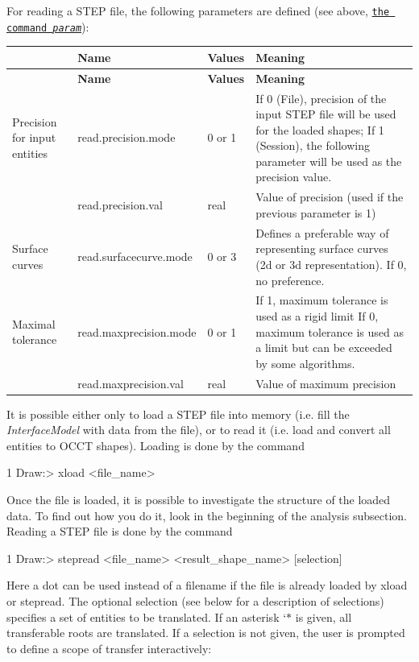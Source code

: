 For reading a S\+T\+EP file, the following parameters are defined (see above, \href{#occt_step_6_2}{\tt the command {\itshape param}})\+:

\tabulinesep=1mm
\begin{longtabu} spread 0pt [c]{*4{|X[-1]}|}
\hline
{}&{\bf Name }&{\bf Values }&{\bf Meaning  }\\
\endfirsthead
\hline
\endfoot
\hline
{}&{\bf Name }&{\bf Values }&{\bf Meaning  }\\
\endhead
Precision for input entities &read.\+precision.\+mode &0 or 1 &If 0 (File), precision of the input S\+T\+EP file will be used for the loaded shapes; If 1 (Session), the following parameter will be used as the precision value. \\
&read.\+precision.\+val &real &Value of precision (used if the previous parameter is 1) \\
Surface curves &read.\+surfacecurve.\+mode &0 or 3 &Defines a preferable way of representing surface curves (2d or 3d representation). If 0, no preference. \\
Maximal tolerance &read.\+maxprecision.\+mode &0 or 1 &If 1, maximum tolerance is used as a rigid limit If 0, maximum tolerance is used as a limit but can be exceeded by some algorithms. \\
&read.\+maxprecision.\+val &real &Value of maximum precision \\
\end{longtabu}
It is possible either only to load a S\+T\+EP file into memory (i.\+e. fill the {\itshape Interface\+Model} with data from the file), or to read it (i.\+e. load and convert all entities to O\+C\+CT shapes). Loading is done by the command 
\begin{DoxyCode}
1 Draw:> xload <file\_name>
\end{DoxyCode}
 Once the file is loaded, it is possible to investigate the structure of the loaded data. To find out how you do it, look in the beginning of the analysis subsection. Reading a S\+T\+EP file is done by the command 
\begin{DoxyCode}
1 Draw:> stepread <file\_name> <result\_shape\_name> [selection] 
\end{DoxyCode}
 Here a dot can be used instead of a filename if the file is already loaded by xload or stepread. The optional selection (see below for a description of selections) specifies a set of entities to be translated. If an asterisk `$\ast$\textquotesingle{} is given, all transferable roots are translated. If a selection is not given, the user is prompted to define a scope of transfer interactively\+:

